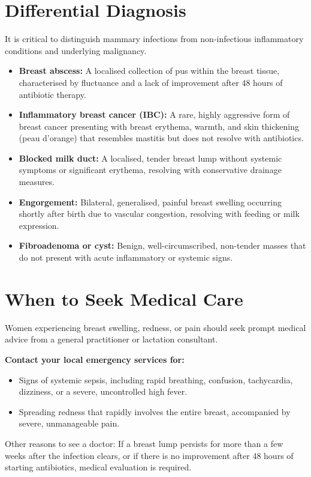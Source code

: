 \section*{Differential Diagnosis}
It is critical to distinguish mammary infections from non-infectious inflammatory conditions and underlying malignancy.
\begin{itemize}
    \item \textbf{Breast abscess:} A localised collection of pus within the breast tissue, characterised by fluctuance and a lack of improvement after 48 hours of antibiotic therapy.
    \item \textbf{Inflammatory breast cancer (IBC):} A rare, highly aggressive form of breast cancer presenting with breast erythema, warmth, and skin thickening (peau d'orange) that resembles mastitis but does not resolve with antibiotics.
    \item \textbf{Blocked milk duct:} A localised, tender breast lump without systemic symptoms or significant erythema, resolving with conservative drainage measures.
    \item \textbf{Engorgement:} Bilateral, generalised, painful breast swelling occurring shortly after birth due to vascular congestion, resolving with feeding or milk expression.
    \item \textbf{Fibroadenoma or cyst:} Benign, well-circumscribed, non-tender masses that do not present with acute inflammatory or systemic signs.
\end{itemize}

\section*{When to Seek Medical Care}
Women experiencing breast swelling, redness, or pain should seek prompt medical advice from a general practitioner or lactation consultant.

\textbf{Contact your local emergency services for:}
\begin{itemize}
    \item Signs of systemic sepsis, including rapid breathing, confusion, tachycardia, dizziness, or a severe, uncontrolled high fever.
    \item Spreading redness that rapidly involves the entire breast, accompanied by severe, unmanageable pain.
\end{itemize}
Other reasons to see a doctor: If a breast lump persists for more than a few weeks after the infection clears, or if there is no improvement after 48 hours of starting antibiotics, medical evaluation is required.

